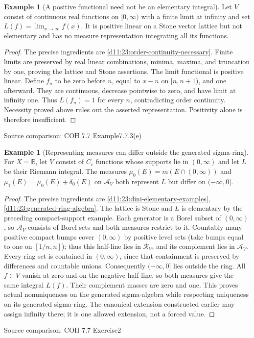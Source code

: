 \documentclass[11pt,oneside,openany]{book}
\theoremstyle{definition}
\newtheorem{example}[theorem]{Example}
\theoremstyle{remark}
\newcommand{\R}{\mathbb R}\newcommand{\C}{\mathbb C}
\newcommand{\family}[1]{}
\newcommand{\source}[1]{\par\begingroup\small\sffamily\color{black!65}Source comparison: #1\par\endgroup}
\begin{document}
\begin{example}[A positive functional need not be an elementary integral]\family{D11.23.positivity_without_order_continuity}\label{d11:23:positivity-without-order-continuity}
Let $V$ consist of continuous real functions on $[0,\infty)$ with a finite limit at infinity and set $L(f)=\lim_{x\to\infty}f(x)$. It is positive linear on a Stone vector lattice but not elementary and has no measure representation integrating all its functions.
\end{example}
\begin{proof}
The precise ingredients are \cref{d11:23:order-continuity-necessary}. Finite limits are preserved by real linear combinations, minima, maxima, and truncation by one, proving the lattice and Stone assertions. The limit functional is positive linear. Define $f_n$ to be zero before $n$, equal to $x-n$ on $[n,n+1)$, and one afterward. They are continuous, decrease pointwise to zero, and have limit at infinity one. Thus $L(f_n)=1$ for every $n$, contradicting order continuity. Necessity proved above rules out the asserted representation. Positivity alone is therefore insufficient.
\end{proof}
\source{COH 7.7 Example7.7.3(e)}

\begin{example}[Representing measures can differ outside the generated sigma-ring]\family{D11.23.sigma_algebra_nonuniqueness}\label{d11:23:sigma-algebra-nonuniqueness}
For $X=\R$, let $V$ consist of $C_c$ functions whose supports lie in $(0,\infty)$ and let $L$ be their Riemann integral. The measures $\mu_0(E)=m(E\cap(0,\infty))$ and $\mu_1(E)=\mu_0(E)+\delta_0(E)$ on $\mathcal A_V$ both represent $L$ but differ on $(-\infty,0]$.
\end{example}
\begin{proof}
The precise ingredients are \cref{d11:23:dini-elementary-examples}, \cref{d11:23:generated-ring-algebra}. The lattice is Stone and $L$ is elementary by the preceding compact-support example. Each generator is a Borel subset of $(0,\infty)$, so $\mathcal A_V$ consists of Borel sets and both measures restrict to it. Countably many positive compact bumps cover $(0,\infty)$ by positive level sets (take bumps equal to one on $[1/n,n]$); thus this half-line lies in $\mathcal R_V$, and its complement lies in $\mathcal A_V$. Every ring set is contained in $(0,\infty)$, since that containment is preserved by differences and countable unions. Consequently $(-\infty,0]$ lies outside the ring. All $f\in V$ vanish at zero and on the negative half-line, so both measures give the same integral $L(f)$. Their complement masses are zero and one. This proves actual nonuniqueness on the generated sigma-algebra while respecting uniqueness on its generated sigma-ring. The canonical extension constructed earlier may assign infinity there; it is one allowed extension, not a forced value.
\end{proof}
\source{COH 7.7 Exercise2}
\end{document}
